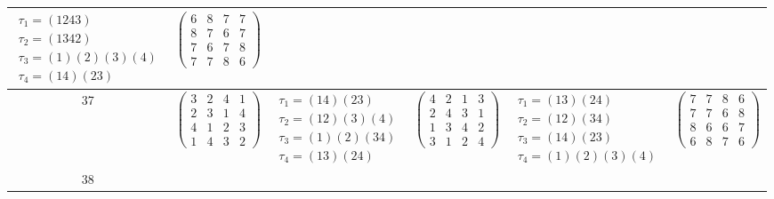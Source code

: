 \begin{longtable}{|c|p{2.7cm}|p{2.7cm}|p{2.7cm}|p{2.7cm}|p{2.7cm}|}
    $\begin{array}{l}\tau_{1}=(1243)\\ \tau_{2}=(1342)\\ \tau_{3}=(1)(2)(3)(4)\\ \tau_{4}=(14)(23)\end{array}$     &
    $\begin{pmatrix} 6 & 8 & 7 & 7 \\ 8 & 7 & 6 & 7 \\ 7 & 6 & 7 & 8 \\ 7 & 7 & 8 & 6 \end{pmatrix}$                                                                                           \\
    \hline
    37                                                                                                             &
    $\begin{pmatrix} 3 & 2 & 4 & 1 \\ 2 & 3 & 1 & 4 \\ 4 & 1 & 2 & 3 \\ 1 & 4 & 3 & 2 \end{pmatrix}$               &
    $\begin{array}{l}\tau_{1}=(14)(23)\\ \tau_{2}=(12)(3)(4)\\ \tau_{3}=(1)(2)(34)\\ \tau_{4}=(13)(24)\end{array}$ &
    $\begin{pmatrix} 4 & 2 & 1 & 3 \\ 2 & 4 & 3 & 1 \\ 1 & 3 & 4 & 2 \\ 3 & 1 & 2 & 4 \end{pmatrix}$               &
    $\begin{array}{l}\tau_{1}=(13)(24)\\ \tau_{2}=(12)(34)\\ \tau_{3}=(14)(23)\\ \tau_{4}=(1)(2)(3)(4)\end{array}$ &
    $\begin{pmatrix} 7 & 7 & 8 & 6 \\ 7 & 7 & 6 & 8 \\ 8 & 6 & 6 & 7 \\ 6 & 8 & 7 & 6 \end{pmatrix}$                                                                                           \\
    \hline
    38                                                                                                             &

\end{longtable}
